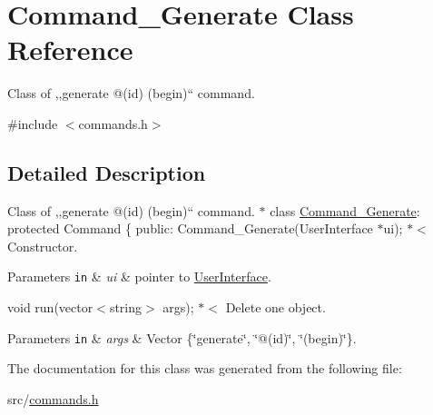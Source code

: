 \hypertarget{classCommand__Generate}{
\section{Command\_\-Generate Class Reference}
\label{d8/de0/classCommand__Generate}
}


Class of ,,generate @(id) (begin)`` command.  




{\ttfamily \#include $<$commands.h$>$}



\subsection{Detailed Description}
Class of ,,generate @(id) (begin)`` command. $\ast$ class \hyperlink{classCommand__Generate}{Command\_\-Generate}: protected Command \{ public: Command\_\-Generate(UserInterface $\ast$ui); $\ast$$<$ Constructor. 
\begin{DoxyParams}[1]{Parameters}
\mbox{\tt in}  & {\em ui} & pointer to \hyperlink{classUserInterface}{UserInterface}.\\
\hline
\end{DoxyParams}
void run(vector$<$string$>$ args); $\ast$$<$ Delete one object. 
\begin{DoxyParams}[1]{Parameters}
\mbox{\tt in}  & {\em args} & Vector \{\char`\"{}generate\char`\"{}, \char`\"{}@(id)\char`\"{}, \char`\"{}(begin)\char`\"{}\}. \\
\hline
\end{DoxyParams}


The documentation for this class was generated from the following file:\begin{DoxyCompactItemize}
\item 
src/\hyperlink{commands_8h}{commands.h}\end{DoxyCompactItemize}
